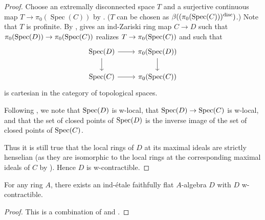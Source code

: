 \begin{proof}
  Choose an extremally disconnected space $T$ and a surjective continuous map $T \to \pi_0(\operatorname{Spec}(C))$ by . (\(T\) can be chosen as \(\beta((\pi_0(\operatorname{Spec}(C)))^{\textnormal{disc}})\).) Note that $T$ is profinite.
  By ,  gives an ind-Zariski ring map
  $C \to D$ such that $\pi_0(\operatorname{Spec} (D)) \to \pi_0(\operatorname{Spec} (C))$ realizes $T \to \pi_0(\operatorname{Spec} (C))$ and such that
  \[
  \begin{tikzcd}
  \operatorname{Spec}(D) \arrow[r] \arrow[d] & \pi_0(\operatorname{Spec}(D)) \arrow[d] \\
  \operatorname{Spec}(C) \arrow[r] & \pi_0(\operatorname{Spec}(C))
  \end{tikzcd}
  \]
  is cartesian in the category of topological spaces.

  Following , we note that $\operatorname{Spec} (D)$ is w-local, that $\operatorname{Spec} (D) \to \operatorname{Spec} (C)$ is w-local, and that the set of closed points of $\operatorname{Spec} (D)$ is the inverse image of the set of closed points of $\operatorname{Spec} (C)$.

  Thus it is still true that the local rings of $D$ at its maximal ideals are strictly henselian (as they are isomorphic to the local rings at the corresponding maximal ideals of $C$ by ). Hence $D$ is w-contractible.
\end{proof}

\begin{theorem}
  For any ring $A$, there exists an ind-étale faithfully flat $A$-algebra $D$ with $D$ w-contractible.
  \label{thm:ind-etale-w-contractible-cover-exists}
  \leanok
\end{theorem}

\begin{proof}
    \leanok
    This is a combination of  and .
\end{proof}

